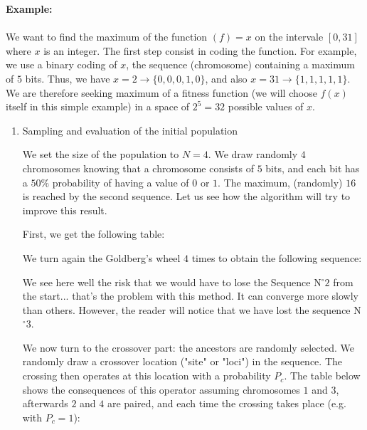 	\begin{tcolorbox}[colframe=black,colback=white,sharp corners]
	\textbf{{\Large {}}Example:}\\\\
	We want to find the maximum of the function $(f)=x$ on the intervale $[0,31]$ where $x$ is an integer. The first step consist in coding the function. For example, we use a binary coding of $x$, the sequence (chromosome) containing a maximum of $5$ bits. Thus, we have $x=2\rightarrow \{0,0,0,1,0\}$, and also $x=31\rightarrow \{1,1,1,1,1\}$. We are therefore seeking maximum of a fitness function (we will choose $f(x)$ itself in this simple example) in a space of $2^5=32$ possible values of $x$.
	\begin{enumerate}
		\item Sampling and evaluation of the initial population

		We set the size of the population to $N=4$. We draw randomly $4$ chromosomes knowing that a chromosome consists of $5$ bits, and each bit has a $50\%$ probability of having a value of $0$ or $1$. The maximum, (randomly) $16$ is reached by the second sequence. Let us see how the algorithm will try to improve this result.

		First, we get the following table:
		
		We turn again the Goldberg's wheel $4$ times to obtain the following sequence:
		
		We see here well the risk that we would have to lose the Sequence N$^\circ 2$ from the start... that's the problem with this method. It can converge more slowly than others. However, the reader will notice that we have lost the sequence N$^\circ 3$.

		We now turn to the crossover part: the ancestors are randomly selected. We randomly draw a crossover location ("site" or "loci") in the sequence. The crossing then operates at this location with a probability $P_c$. The table below shows the consequences of this operator assuming chromosomes $1$ and $3$, afterwards $2$ and $4$ are paired, and each time the crossing takes place (e.g. with $P_c=1$):
	\end{enumerate}
	\end{tcolorbox}
	
